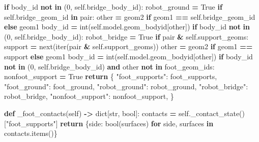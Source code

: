 \documentclass[
  american,
  11pt,
  letterpaper,
]{article}
\newenvironment{Shaded}{\begin{snugshade}}{\end{snugshade}}
\newcommand{\BuiltInTok}[1]{#1}
\newcommand{\ControlFlowTok}[1]{\textcolor[rgb]{0.13,0.29,0.53}{\textbf{#1}}}
\newcommand{\DecValTok}[1]{\textcolor[rgb]{0.00,0.00,0.81}{#1}}
\newcommand{\KeywordTok}[1]{\textcolor[rgb]{0.13,0.29,0.53}{\textbf{#1}}}
\newcommand{\NormalTok}[1]{#1}
\newcommand{\OperatorTok}[1]{\textcolor[rgb]{0.81,0.36,0.00}{\textbf{#1}}}
\newcommand{\StringTok}[1]{\textcolor[rgb]{0.31,0.60,0.02}{#1}}
\newcommand{\VariableTok}[1]{\textcolor[rgb]{0.00,0.00,0.00}{#1}}
\renewenvironment{Shaded}{\par\smallskip}{\par\smallskip}
\begin{document}
\begin{Shaded}
\begin{Highlighting}[]
                \ControlFlowTok{if}\NormalTok{ body\_id }\KeywordTok{not} \KeywordTok{in}\NormalTok{ (}\DecValTok{0}\NormalTok{, }\VariableTok{self}\NormalTok{.bridge\_body\_id):}
\NormalTok{                    robot\_ground }\OperatorTok{=} \VariableTok{True}
            \ControlFlowTok{if} \VariableTok{self}\NormalTok{.bridge\_geom\_id }\KeywordTok{in}\NormalTok{ pair:}
\NormalTok{                other }\OperatorTok{=}\NormalTok{ geom2 }\ControlFlowTok{if}\NormalTok{ geom1 }\OperatorTok{==} \VariableTok{self}\NormalTok{.bridge\_geom\_id }\ControlFlowTok{else}\NormalTok{ geom1}
\NormalTok{                body\_id }\OperatorTok{=} \BuiltInTok{int}\NormalTok{(}\VariableTok{self}\NormalTok{.model.geom\_bodyid[other])}
                \ControlFlowTok{if}\NormalTok{ body\_id }\KeywordTok{not} \KeywordTok{in}\NormalTok{ (}\DecValTok{0}\NormalTok{, }\VariableTok{self}\NormalTok{.bridge\_body\_id):}
\NormalTok{                    robot\_bridge }\OperatorTok{=} \VariableTok{True}
            \ControlFlowTok{if}\NormalTok{ pair }\OperatorTok{\&} \VariableTok{self}\NormalTok{.support\_geoms:}
\NormalTok{                support }\OperatorTok{=} \BuiltInTok{next}\NormalTok{(}\BuiltInTok{iter}\NormalTok{(pair }\OperatorTok{\&} \VariableTok{self}\NormalTok{.support\_geoms))}
\NormalTok{                other }\OperatorTok{=}\NormalTok{ geom2 }\ControlFlowTok{if}\NormalTok{ geom1 }\OperatorTok{==}\NormalTok{ support }\ControlFlowTok{else}\NormalTok{ geom1}
\NormalTok{                body\_id }\OperatorTok{=} \BuiltInTok{int}\NormalTok{(}\VariableTok{self}\NormalTok{.model.geom\_bodyid[other])}
                \ControlFlowTok{if}\NormalTok{ body\_id }\KeywordTok{not} \KeywordTok{in}\NormalTok{ (}\DecValTok{0}\NormalTok{, }\VariableTok{self}\NormalTok{.bridge\_body\_id) }\KeywordTok{and}\NormalTok{ other }\KeywordTok{not} \KeywordTok{in}\NormalTok{ foot\_geom\_ids:}
\NormalTok{                    nonfoot\_support }\OperatorTok{=} \VariableTok{True}
        \ControlFlowTok{return}\NormalTok{ \{}
            \StringTok{"foot\_supports"}\NormalTok{: foot\_supports,}
            \StringTok{"foot\_ground"}\NormalTok{: foot\_ground,}
            \StringTok{"robot\_ground"}\NormalTok{: robot\_ground,}
            \StringTok{"robot\_bridge"}\NormalTok{: robot\_bridge,}
            \StringTok{"nonfoot\_support"}\NormalTok{: nonfoot\_support,}
\NormalTok{        \}}

    \KeywordTok{def}\NormalTok{ \_foot\_contacts(}\VariableTok{self}\NormalTok{) }\OperatorTok{{-}\textgreater{}} \BuiltInTok{dict}\NormalTok{[}\BuiltInTok{str}\NormalTok{, }\BuiltInTok{bool}\NormalTok{]:}
\NormalTok{        contacts }\OperatorTok{=} \VariableTok{self}\NormalTok{.\_contact\_state()[}\StringTok{"foot\_supports"}\NormalTok{]}
        \ControlFlowTok{return}\NormalTok{ \{side: }\BuiltInTok{bool}\NormalTok{(surfaces) }\ControlFlowTok{for}\NormalTok{ side, surfaces }\KeywordTok{in}\NormalTok{ contacts.items()\}}


\end{Highlighting}
\end{Shaded}
\end{document}

